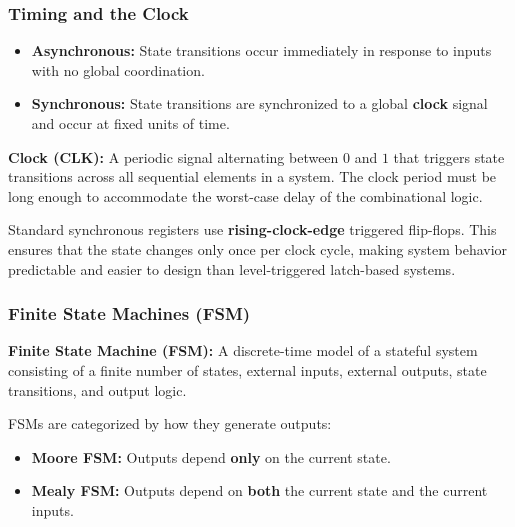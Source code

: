 \subsubsection{Timing and the Clock}

\begin{definition}
	\begin{itemize}
		\item \textbf{Asynchronous:} State transitions occur immediately in response to inputs with no global coordination.
		\item \textbf{Synchronous:} State transitions are synchronized to a global \textbf{clock} signal and occur at fixed units of time.
	\end{itemize}
\end{definition}

\begin{definition}
	\textbf{Clock (CLK):} A periodic signal alternating between $0$ and $1$ that triggers state transitions across all sequential elements in a system. The clock period must be long enough to accommodate the worst-case delay of the combinational logic.
\end{definition}

\begin{important}
	Standard synchronous registers use \textbf{rising-clock-edge} triggered flip-flops. This ensures that the state changes only once per clock cycle, making system behavior predictable and easier to design than level-triggered latch-based systems.
\end{important}

\subsubsection{Finite State Machines (FSM)}

\begin{definition}
	\textbf{Finite State Machine (FSM):} A discrete-time model of a stateful system consisting of a finite number of states, external inputs, external outputs, state transitions, and output logic.
\end{definition}

\begin{theorem}
	FSMs are categorized by how they generate outputs:
	\begin{itemize}
		\item \textbf{Moore FSM:} Outputs depend \textbf{only} on the current state.
		\item \textbf{Mealy FSM:} Outputs depend on \textbf{both} the current state and the current inputs.
	\end{itemize}
\end{theorem}

